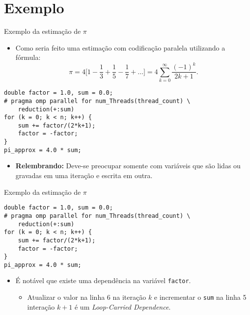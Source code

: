 \section{Exemplo}

\begin{frame}[fragile]{Exemplo da estimação de $\pi$}
	\begin{itemize}
		\item Como seria feito uma estimação com codificação paralela utilizando a fórmula: 
		$$\pi = 4\Bigg[ 1 - \frac{1}{3} + \frac{1}{5} - \frac{1}{7} + \dots \Bigg] = 4 \sum\limits_{k=0}^\infty \frac{(-1)^k}{2k+1}.$$
	\end{itemize}

		\pause

	\begin{lstlisting}
double factor = 1.0, sum = 0.0;
# pragma omp parallel for num_Threads(thread_count) \
	reduction(+:sum)
for (k = 0; k < n; k++) {
	sum += factor/(2*k+1);
	factor = -factor;
}
pi_approx = 4.0 * sum;
	\end{lstlisting}

	\begin{itemize}
		\item {\bf Relembrando:} Deve-se preocupar somente com variáveis que são lidas ou gravadas em uma iteração e escrita em outra.
	\end{itemize}
\end{frame}




\begin{frame}[fragile]{Exemplo da estimação de $\pi$}
	\begin{lstlisting}
double factor = 1.0, sum = 0.0;
# pragma omp parallel for num_Threads(thread_count) \
	reduction(+:sum)
for (k = 0; k < n; k++) {
	sum += factor/(2*k+1);
	factor = -factor;
}
pi_approx = 4.0 * sum;
	\end{lstlisting}

	\begin{itemize}
		\item É notável que existe uma dependência na variável {\tt factor}.
				\pause
		\begin{itemize}
		    \item Atualizar o valor na linha 6 na iteração $k$ e incrementar o {\tt sum} na linha 5 interação $k+1$ é um \textit{Loop-Carried Dependence}.
		\end{itemize}
	\end{itemize}
\end{frame}



